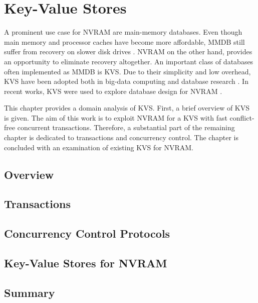 \chapter{Key-Value Stores}
\label{ch:kvs}

A prominent use case for \ac{NVRAM} are main-memory databases. Even though main
memory and processor caches have become more affordable, \ac{MMDB} still suffer
from recovery on slower disk drives \cite{oukid2015instant, schwalb2016hyrise}.
\ac{NVRAM} on the other hand, provides an opportunity to eliminate recovery
altogether. An important class of databases often implemented as \ac{MMDB} is
\ac{KVS}. Due to their simplicity and low overhead, \ac{KVS} have been adopted
both in big-data computing and database research \cite{decandia2007dynamo,
lakshman2010cassandra, wang2015hydradb}. In recent works, \ac{KVS} were used to
explore database design for \ac{NVRAM} \cite{bailey2013exploring, zhou2016nvht,
wu2016nvmcached}.

This chapter provides a domain analysis of \ac{KVS}. First, a brief overview of
\ac{KVS} is given. The aim of this work is to exploit \ac{NVRAM} for a \ac{KVS}
with fast conflict-free concurrent transactions. Therefore, a substantial part
of the remaining chapter is dedicated to transactions and concurrency control.
The chapter is concluded with an examination of existing \ac{KVS} for
\ac{NVRAM}.

\section{Overview}
\label{ch:kvs-overview}


\section{Transactions}
\label{ch:kvs-tx}


\section{Concurrency Control Protocols}
\label{ch:kvs-cc}


\section{Key-Value Stores for NVRAM}
\label{ch:kvs-nvram}


\section{Summary}
\label{ch:kvs-summary}

